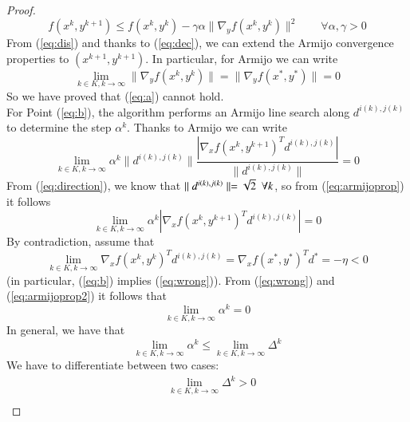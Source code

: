 \begin{proof}
\begin{equation}
f(x^{k}, y^{k+1}) \leq f(x^{k}, y^{k}) - \gamma \alpha \parallel \nabla_y f(x^{k}, y^{k}) \parallel ^2 \qquad \forall \alpha, \gamma > 0
\end{equation}
From (\ref{eq:dis}) and thanks to (\ref{eq:dec}), we can extend the Armijo convergence properties to $(x^{k+1}, y^{k+1})$. In particular, for Armijo we can write
\begin{equation}
\lim_{k \in K, k \rightarrow \infty} \parallel \nabla_y f(x^{k}, y^{k}) \parallel =  \parallel \nabla_y f(x^{*}, y^{*}) \parallel = 0
\end{equation}
So we have proved that (\ref{eq:a}) cannot hold.\\
For Point (\ref{eq:b}), the algorithm performs an Armijo line search along $d^{i(k),j(k)}$ to determine the step $\alpha^{k}$. Thanks to Armijo we can write
\begin{equation}\label{eq:armijoprop}
\lim_{k \in K, k \rightarrow \infty} \alpha^{k} \parallel d^{i(k),j(k)} \parallel \frac{ \left| \nabla_x f(x^{k}, y^{k+1})^T d^{i(k),j(k)} \right|}{\parallel d^{i(k),j(k)} \parallel} = 0
\end{equation}
From (\ref{eq:direction}), we know that $\parallel d^{i(k),j(k)} \parallel = \sqrt{2} \enskip\forall k$, so from (\ref{eq:armijoprop}) it follows
\begin{equation}\label{eq:armijoprop2}
\lim_{k \in K, k \rightarrow \infty} \alpha^{k}  \left| \nabla_x f(x^{k}, y^{k+1})^T d^{i(k),j(k)} \right| = 0
\end{equation}
By contradiction, assume that 
\begin{equation}\label{eq:wrong}
\lim_{k \in K, k \rightarrow \infty} \nabla_x f(x^k, y^k)^T d^{i(k),j(k)} = \nabla_x f(x^*, y^*)^T d^* = -\eta < 0
\end{equation}
(in particular, (\ref{eq:b}) implies (\ref{eq:wrong})).
From (\ref{eq:wrong}) and (\ref{eq:armijoprop2}) it follows that
\begin{equation}\label{eq:alpha}
\lim_{k \in K, k \rightarrow \infty} \alpha^k = 0
\end{equation}
In general, we have that
\begin{equation}
\lim_{k \in K, k \rightarrow \infty} \alpha^k \leq \lim_{k \in K, k \rightarrow \infty} \Delta^k
\end{equation}
We have to differentiate between two cases:
\begin{subequations}
\begin{align}
& \lim_{k \in K, k \rightarrow \infty} \Delta^k > 0 \label{eq:great}\\

\end{align}
\end{subequations}
\end{proof}
